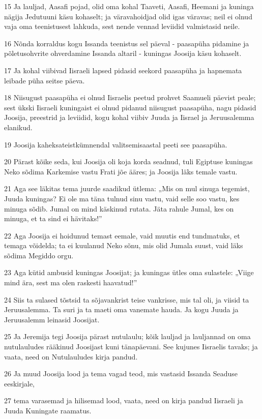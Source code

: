 \par 15 Ja lauljad, Aasafi pojad, olid oma kohal Taaveti, Aasafi, Heemani ja kuninga nägija Jedutuuni käsu kohaselt; ja väravahoidjad olid igas väravas; neil ei olnud vaja oma teenistusest lahkuda, sest nende vennad leviidid valmistasid neile.
\par 16 Nõnda korraldus kogu Issanda teenistus sel päeval - paasapüha pidamine ja põletusohvrite ohverdamine Issanda altaril - kuningas Joosija käsu kohaselt.
\par 17 Ja kohal viibivad Iisraeli lapsed pidasid seekord paasapüha ja hapnemata leibade püha seitse päeva.
\par 18 Niisugust paasapüha ei olnud Iisraelis peetud prohvet Saamueli päevist peale; sest ükski Iisraeli kuningaist ei olnud pidanud niisugust paasapüha, nagu pidasid Joosija, preestrid ja leviidid, kogu kohal viibiv Juuda ja Iisrael ja Jeruusalemma elanikud.
\par 19 Joosija kaheksateistkümnendal valitsemisaastal peeti see paasapüha.
\par 20 Pärast kõike seda, kui Joosija oli koja korda seadnud, tuli Egiptuse kuningas Neko sõdima Karkemise vastu Frati jõe ääres; ja Joosija läks temale vastu.
\par 21 Aga see läkitas tema juurde saadikud ütlema: „Mis on mul sinuga tegemist, Juuda kuningas? Ei ole ma täna tulnud sinu vastu, vaid selle soo vastu, kes minuga sõdib. Jumal on mind käskinud rutata. Jäta rahule Jumal, kes on minuga, et ta sind ei hävitaks!”
\par 22 Aga Joosija ei hoidunud temast eemale, vaid muutis end tundmatuks, et temaga võidelda; ta ei kuulanud Neko sõnu, mis olid Jumala suust, vaid läks sõdima Megiddo orgu.
\par 23 Aga kütid ambusid kuningas Joosijat; ja kuningas ütles oma sulastele: „Viige mind ära, sest ma olen raskesti haavatud!”
\par 24 Siis ta sulased tõstsid ta sõjavankrist teise vankrisse, mis tal oli, ja viisid ta Jeruusalemma. Ta suri ja ta maeti oma vanemate hauda. Ja kogu Juuda ja Jeruusalemm leinasid Joosijat.
\par 25 Ja Jeremija tegi Joosija pärast nutulaulu; kõik lauljad ja lauljannad on oma nutulauludes rääkinud Joosijast kuni tänapäevani. See kujunes Iisraelis tavaks; ja vaata, need on Nutulauludes kirja pandud.
\par 26 Ja muud Joosija lood ja tema vagad teod, mis vastasid Issanda Seaduse eeskirjale,
\par 27 tema varasemad ja hilisemad lood, vaata, need on kirja pandud Iisraeli ja Juuda Kuningate raamatus.

